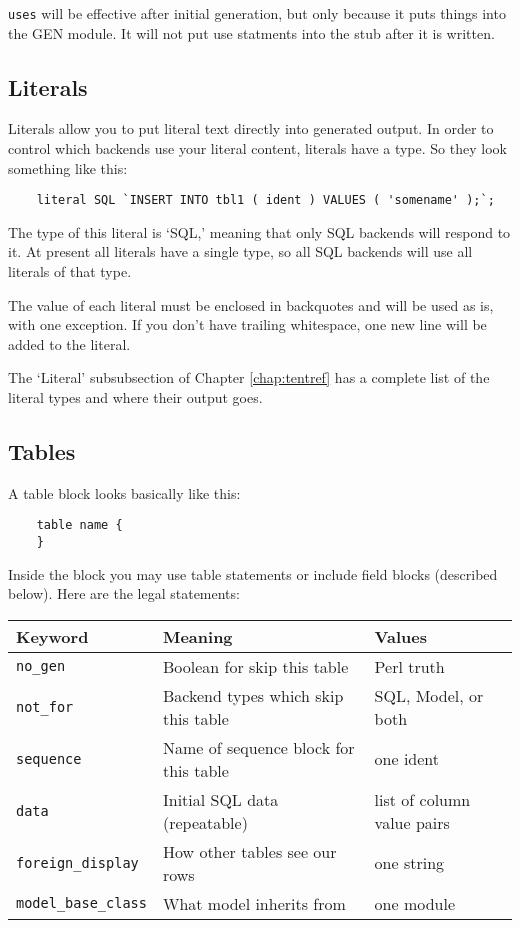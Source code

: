 \verb+uses+ will be effective after initial generation, but only because
it puts things into the GEN module.  It will not put use statments into the
stub after it is written.

\subsection*{Literals}

Literals allow you to put literal text directly into generated output.
In order to control which backends use your literal content, literals have a
type.  So they look something like this:

\begin{verbatim}
    literal SQL `INSERT INTO tbl1 ( ident ) VALUES ( 'somename' );`;
\end{verbatim}

The type of this literal is `SQL,' meaning that only SQL backends will
respond to it.  At present all literals have a single type, so all SQL
backends will use all literals of that type.

The value of each literal must be enclosed in backquotes and will be used
as is, with one exception.  If you don't have trailing whitespace, one new
line will be added to the literal.

The `Literal' subsubsection of Chapter \ref{chap:tentref} has a complete
list of the literal types and where their output goes.

\subsection*{Tables}

A table block looks basically like this:

\begin{verbatim}
    table name {
    }
\end{verbatim}

Inside the block you may use table statements or include field blocks
(described below).  Here are the legal statements:

\begin{tabular}{l|l|l}
Keyword & Meaning & Values \\
\hline
\verb+no_gen+  & Boolean for skip this table & Perl truth \\
\verb+not_for+ & Backend types which skip this table & SQL, Model, or both \\
\verb+sequence+         & Name of sequence block for this table & one ident \\
\verb+data+ & Initial SQL data (repeatable) & list of column value pairs \\
\verb+foreign_display+  & How other tables see our rows & one string \\
\verb+model_base_class+ & What model inherits from & one module \\
\end{tabular}

